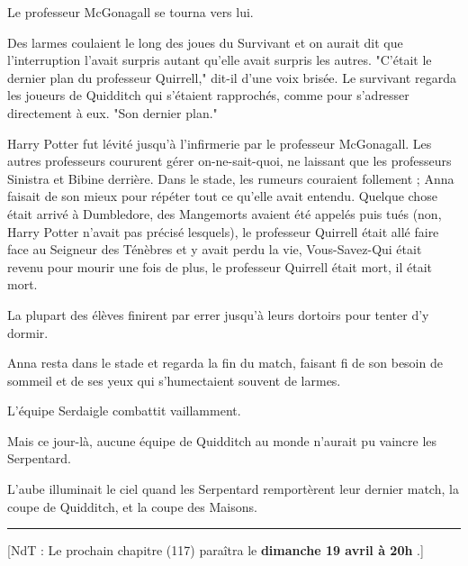Le professeur McGonagall se tourna vers lui.

Des larmes coulaient le long des joues du Survivant et on aurait dit que l'interruption l'avait surpris autant qu'elle avait surpris les autres. "C'était le dernier plan du professeur Quirrell," dit-il d'une voix brisée. Le survivant regarda les joueurs de Quidditch qui s'étaient rapprochés, comme pour s'adresser directement à eux. "Son dernier plan."

Harry Potter fut lévité jusqu'à l'infirmerie par le professeur McGonagall. Les autres professeurs coururent gérer on-ne-sait-quoi, ne laissant que les professeurs Sinistra et Bibine derrière. Dans le stade, les rumeurs couraient follement ; Anna faisait de son mieux pour répéter tout ce qu'elle avait entendu. Quelque chose était arrivé à Dumbledore, des Mangemorts avaient été appelés puis tués (non, Harry Potter n'avait pas précisé lesquels), le professeur Quirrell était allé faire face au Seigneur des Ténèbres et y avait perdu la vie, Vous-Savez-Qui était revenu pour mourir une fois de plus, le professeur Quirrell était mort, il était mort.

La plupart des élèves finirent par errer jusqu'à leurs dortoirs pour tenter d'y dormir.

Anna resta dans le stade et regarda la fin du match, faisant fi de son besoin de sommeil et de ses yeux qui s'humectaient souvent de larmes.

L'équipe Serdaigle combattit vaillamment.

Mais ce jour-là, aucune équipe de Quidditch au monde n'aurait pu vaincre les Serpentard.

L'aube illuminait le ciel quand les Serpentard remportèrent leur dernier match, la coupe de Quidditch, et la coupe des Maisons.
\par\noindent\rule{\textwidth}{0.4pt}
[NdT : Le prochain chapitre (117) paraîtra le \textbf{dimanche 19 avril à 20h} .]

